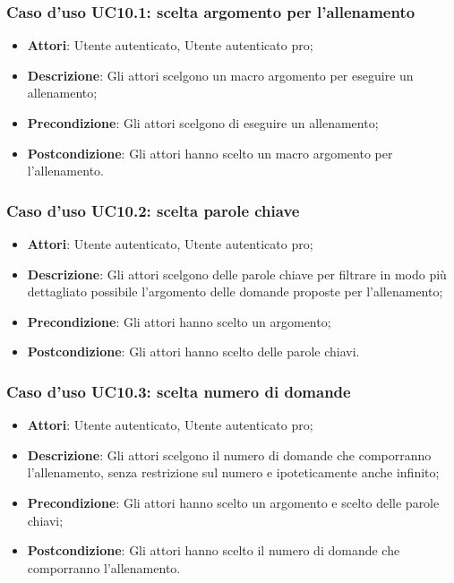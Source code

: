 \subsubsection{Caso d'uso UC10.1: scelta argomento per l'allenamento}
	\begin{itemize}
		\item \textbf{Attori}: Utente autenticato, Utente autenticato pro;
		\item \textbf{Descrizione}: Gli attori scelgono un macro argomento per eseguire un allenamento;
		\item \textbf{Precondizione}: Gli attori scelgono di eseguire un allenamento;
		\item \textbf{Postcondizione}: Gli attori hanno scelto un macro argomento per l'allenamento.
	\end{itemize}
\subsubsection{Caso d'uso UC10.2: scelta parole chiave}
	\begin{itemize}
		\item \textbf{Attori}: Utente autenticato, Utente autenticato pro;
		\item \textbf{Descrizione}: Gli attori scelgono delle parole chiave per filtrare in modo più dettagliato possibile l'argomento delle domande proposte per l'allenamento;
		\item \textbf{Precondizione}: Gli attori hanno scelto un argomento;
		\item \textbf{Postcondizione}: Gli attori hanno scelto delle parole chiavi.
	\end{itemize}
\subsubsection{Caso d'uso UC10.3: scelta numero di domande}
	\begin{itemize}
		\item \textbf{Attori}: Utente autenticato, Utente autenticato pro;
		\item \textbf{Descrizione}: Gli attori scelgono il numero di domande che comporranno l'allenamento, senza restrizione sul numero e ipoteticamente anche infinito;
		\item \textbf{Precondizione}: Gli attori hanno scelto un argomento e scelto delle parole chiavi;
		\item \textbf{Postcondizione}: Gli attori hanno scelto il numero di domande che comporranno l'allenamento.
	\end{itemize}
